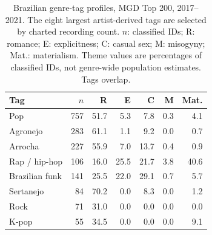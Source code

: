 \begin{table}[t]
\caption{Brazilian genre-tag profiles, MGD Top 200, 2017--2021. The eight largest artist-derived tags are selected by charted recording count. $n$: classified IDs; R: romance; E: explicitness; C: casual sex; M: misogyny; Mat.: materialism. Theme values are percentages of classified IDs, not genre-wide population estimates. Tags overlap.}
\label{tab:genre-profiles}
\centering\scriptsize\setlength{\tabcolsep}{2.8pt}
\begin{tabular}{@{}lrrrrrr@{}}\toprule Tag & $n$ & R & E & C & M & Mat.\\\midrule
Pop & 757 & 51.7 & 5.3 & 7.8 & 0.3 & 4.1 \\
Agronejo & 283 & 61.1 & 1.1 & 9.2 & 0.0 & 0.7 \\
Arrocha & 227 & 55.9 & 7.0 & 13.7 & 0.4 & 0.9 \\
Rap / hip-hop & 106 & 16.0 & 25.5 & 21.7 & 3.8 & 40.6 \\
Brazilian funk & 141 & 25.5 & 22.0 & 29.1 & 0.7 & 5.7 \\
Sertanejo & 84 & 70.2 & 0.0 & 8.3 & 0.0 & 1.2 \\
Rock & 71 & 31.0 & 0.0 & 0.0 & 0.0 & 0.0 \\
K-pop & 55 & 34.5 & 0.0 & 0.0 & 0.0 & 9.1 \\
\bottomrule\end{tabular}
\end{table}